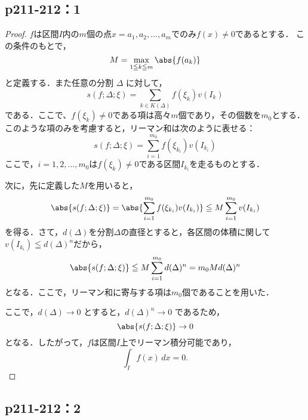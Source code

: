 \documentclass[a4paper,10pt,fleqn]{ltjsarticle}
\begin{document}
\subsection*{p211-212：1}


\begin{tleftbar}
    \begin{proof}
    $f$は区間$I$内の$m$個の点$x = a_1, a_2, \ldots, a_m$でのみ$f(x) \ne 0$であるとする．
    この条件のもとで，
    \[
    M = \max_{1 \leqq k \leqq m} \abs{f(a_k)}
    \]
    と定義する．また任意の分割 $\Delta$ に対して，
    \[
    s(f; \Delta; \xi) = \sum_{k \in K(\Delta)} f(\xi_k) v(I_k)
    \]
    である．ここで、$f(\xi_k) \ne 0$である項は高々$m$個であり，その個数を$m_0$とする．
    このような項のみを考慮すると，リーマン和は次のように表せる：
    \[
    s(f; \Delta; \xi) = \sum_{i=1}^{m_0} f(\xi_{k_i}) v(I_{k_i})
    \]
    ここで，$i = 1, 2, \ldots, m_0$は$f(\xi_k) \ne 0$である区間$ I_{k_i} $を走るものとする．
    
    次に，先に定義した$M$を用いると，
    \[
    \abs{s(f; \Delta; \xi)} = \abs{\sum_{i=1}^{m_0} f(\xi_{k_i}) v(I_{k_i})} \leqq M \sum_{i=1}^{m_0} v(I_{k_i})
    \]
    を得る．さて，$d(\Delta)$を分割$\Delta$の直径とすると，各区間の体積に関して$ v(I_{k_i}) \leqq d(\Delta)^n $だから，
    \[
    \abs{s(f; \Delta; \xi)} \leqq M \sum_{i=1}^{m_0} d(\Delta)^n = m_0 M d(\Delta)^n
    \]
    となる．ここで，リーマン和に寄与する項は$m_0$個であることを用いた．
    
    ここで，$d(\Delta) \to 0$ とすると，$d(\Delta)^n \to 0$ であるため，
    \[
    \abs{s(f; \Delta; \xi)} \to 0
    \]
    となる．したがって，$f$は区間$I$上でリーマン積分可能であり，
    \[
    \int_{I} f(x)\, dx = 0.
    \]
    \end{proof}
    \end{tleftbar}

    \subsection*{p211-212：2}
    
\end{document}
